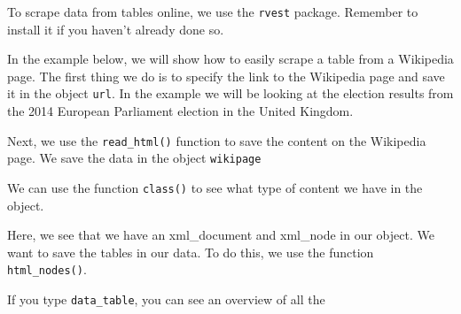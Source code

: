 \documentclass[12pt,oneside]{reedthesis}
\theoremstyle{definition}
\theoremstyle{definition}
\theoremstyle{definition}
\theoremstyle{remark}
\begin{document}
  To scrape data from tables online, we use the \texttt{rvest} package.
  Remember to install it if you haven't already done so.
  \begin{Shaded}
  \begin{Highlighting}[]
  \NormalTok{(}\NormalTok{)}
  \end{Highlighting}
  \end{Shaded}
  In the example below, we will show how to easily scrape a table from a
  Wikipedia page. The first thing we do is to specify the link to the
  Wikipedia page and save it in the object \texttt{url}. In the example we
  will be looking at the election results from the 2014 European
  Parliament election in the United Kingdom.
  \begin{Shaded}
  \begin{Highlighting}[]
  \StringTok{ }\NormalTok{(}
  \NormalTok{  )}
  \end{Highlighting}
  \end{Shaded}
  Next, we use the \texttt{read\_html()} function to save the content on
  the Wikipedia page. We save the data in the object \texttt{wikipage}
  \begin{Shaded}
  \begin{Highlighting}[]
  \StringTok{ }
  \end{Highlighting}
  \end{Shaded}
  We can use the function \texttt{class()} to see what type of content we
  have in the object.
  \begin{Shaded}
  \begin{Highlighting}[]
  \end{Highlighting}
  \end{Shaded}
  Here, we see that we have an xml\_document and xml\_node in our object.
  We want to save the tables in our data. To do this, we use the function
  \texttt{html\_nodes()}.
  \begin{Shaded}
  \begin{Highlighting}[]
  \StringTok{ }\NormalTok{)}
  \end{Highlighting}
  \end{Shaded}
  If you type \texttt{data\_table}, you can see an overview of all the
\end{document}
